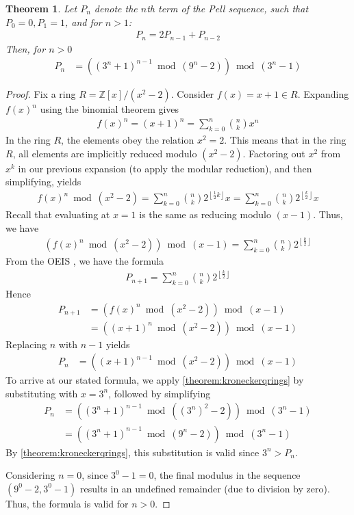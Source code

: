 \documentclass[11pt,reqno]{article}
\theoremstyle{plain}
\newtheorem{theorem}{Theorem}
\theoremstyle{definition}
\newcommand{\floor}[1]{\left\lfloor #1 \right\rfloor}
\begin{document}
\begin{theorem} \label{theorem:pell}
Let $P_n$ denote the $n$th term of the Pell sequence, such that $P_0 = 0, P_1 = 1$, and for $n > 1$:
\begin{align*}
    P_n = 2 P_{n-1} + P_{n-2}
\end{align*}
Then, for $n > 0$
\begin{align*}
P_n &= ((3^n+1)^{n-1} \bmod{(9^n-2)}) \bmod{(3^n-1)} 
\end{align*}
\end{theorem}
\begin{proof}
Fix a ring $R = \mathbb{Z}[x]/(x^2 - 2)$. Consider $f(x) = x+1 \in R$. Expanding $f(x)^n$ using the binomial theorem gives
\begin{align*}
    f(x)^n = (x+1)^n = \sum_{k=0}^{n} \binom{n}{k} x^n
\end{align*}
In the ring $R$, the elements obey the relation $x^2 = 2$. This means that in the ring $R$, all elements are implicitly reduced modulo $(x^2 - 2)$. Factoring out $x^2$ from $x^k$ in our previous expansion (to apply the modular reduction), and then simplifying, yields
\begin{align*}
    f(x)^n \bmod{(x^2 - 2)} = \sum_{k=0}^{n} \binom{n}{k} 2^{\floor{\frac{1}{2} k}} x
    = \sum_{k=0}^{n} \binom{n}{k} 2^{\floor{\frac{k}{2}}} x
\end{align*}
Recall that evaluating at $x=1$ is the same as reducing modulo $(x-1)$. Thus, we have
\begin{align*}
    (f(x)^n \bmod{(x^2-2)}) \bmod{(x-1)} = \sum_{k=0}^{n} \binom{n}{k} 2^{\floor{\frac{k}{2}}}
\end{align*}
From the OEIS \cite{A000129}, we have the formula
\begin{align*}
    P_{n+1} = \sum_{k=0}^{n} \binom{n}{k} 2^{\floor{\frac{k}{2}}}
\end{align*}
Hence
\begin{align*}
    P_{n+1} &= (f(x)^n \bmod{(x^2-2)}) \bmod{(x-1)} \\
    &= ((x+1)^n \bmod{(x^2-2)}) \bmod{(x-1)}
\end{align*}
Replacing $n$ with $n-1$ yields
\begin{align*}
    P_n &= ((x+1)^{n-1} \bmod{(x^2-2)}) \bmod{(x-1)}
\end{align*}
To arrive at our stated formula, we apply \cref{theorem:kroneckerqrings} by substituting with $x = 3^n$, followed by simplifying
\begin{align*}
     P_n &= ((3^n+1)^{n-1} \bmod{((3^n)^2-2)}) \bmod{(3^n-1)} \\
     &= ((3^n+1)^{n-1} \bmod{(9^n-2)}) \bmod{(3^n-1)} 
\end{align*}
By \cref{theorem:kroneckerqrings}, this substitution is valid since $3^n > P_n$.

Considering $n = 0$, since $3^0-1 = 0$, the final modulus in the sequence $(9^0-2, 3^0-1)$ results in an undefined remainder (due to division by zero). Thus, the formula is valid for $n > 0$.
\end{proof}
\end{document}
